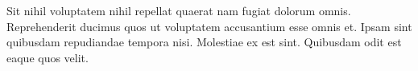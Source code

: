 \begin{dedicationpage}
    Sit nihil voluptatem nihil repellat quaerat nam fugiat dolorum omnis. Reprehenderit ducimus quos ut voluptatem accusantium esse omnis et. Ipsam sint quibusdam repudiandae tempora nisi. Molestiae ex est sint. Quibusdam odit est eaque quos velit.
\end{dedicationpage}
